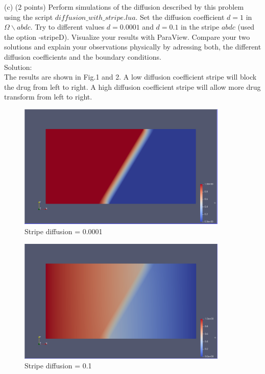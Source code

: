 \documentclass[a4paper]{article}
\begin{document}
\noindent (c) (2 points) Perform simulations of the diffusion described by this problem using the script $diffusion\_with\_stripe.lua$. Set the diffusion coefficient $d=1$ in $\Omega \backslash a b d c$. Try to different values $d=0.0001$ and $d=0.1$ in the stripe $a b d c$ (used the option -stripeD). Visualize your results with ParaView. Compare your two solutions and explain your observations physically by adressing both, the different diffusion coefficients and the boundary conditions.\\

\noindent Solution:\\
\noindent The results are shown in Fig.1 and 2. A low diffusion coefficient stripe will block the drug from left to right. A high diffusion coefficient stripe will allow more drug transform from left to right.\\
\begin{figure}[htbp]
	\centering
	\begin{minipage}[t]{0.7\textwidth}
		\centering		\includegraphics[width=10cm]{2.png}
		\caption{Stripe diffusion = 0.0001}
	\end{minipage}
\end{figure}
\begin{figure}[htbp]
	\centering
	\begin{minipage}[t]{0.7\textwidth}
		\centering		\includegraphics[width=10cm]{3.png}
		\caption{Stripe diffusion = 0.1}
	\end{minipage}
\end{figure}
\end{document}
